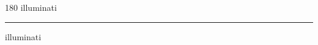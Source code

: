 
\begin{frame}
\begin{center}
\begin{turn}{180}
{\fontsize{2.5cm}{1em}\selectfont illuminati}
\end{turn}
\vspace{1em}\par  
\hrule
\vspace{1em}\par  
{\fontsize{2.5cm}{1em}\selectfont illuminati}
\end{center}
\end{frame}

